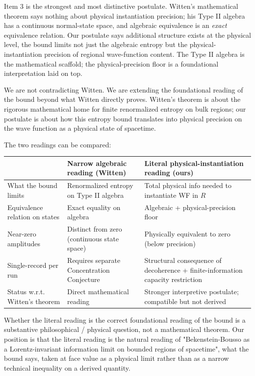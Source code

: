 \documentclass[11pt,a4paper]{article}
\begin{document}
Item 3 is the strongest and most distinctive postulate. Witten's mathematical theorem says nothing about physical instantiation precision; his Type II algebra has a continuous normal-state space, and algebraic equivalence is an \emph{exact} equivalence relation. Our postulate says additional structure exists at the physical level, the bound limits not just the algebraic entropy but the physical-instantiation precision of regional wave-function content. The Type II algebra is the mathematical scaffold; the physical-precision floor is a foundational interpretation laid on top.

We are not contradicting Witten. We are extending the foundational reading of the bound beyond what Witten directly proves. Witten's theorem is about the rigorous mathematical home for finite renormalized entropy on bulk regions; our postulate is about how this entropy bound translates into physical precision on the wave function as a physical state of spacetime.

The two readings can be compared:

\begin{center}
\small
\begin{tabularx}{\linewidth}{|Y|Y|Y|}
\hline
\textbf{} & \textbf{Narrow algebraic reading (Witten)} & \textbf{Literal physical-instantiation reading (ours)} \\
\hline
What the bound limits & Renormalized entropy on Type II algebra & Total physical info needed to instantiate WF in $R$ \\
\hline
Equivalence relation on states & Exact equality on algebra & Algebraic + physical-precision floor \\
\hline
Near-zero amplitudes & Distinct from zero (continuous state space) & Physically equivalent to zero (below precision) \\
\hline
Single-record per run & Requires separate Concentration Conjecture & Structural consequence of decoherence + finite-information capacity restriction \\
\hline
Status w.r.t. Witten's theorem & Direct mathematical reading & Stronger interpretive postulate; compatible but not derived \\
\hline
\end{tabularx}
\end{center}

Whether the literal reading is the correct foundational reading of the bound is a substantive philosophical / physical question, not a mathematical theorem. Our position is that the literal reading is the natural reading of "Bekenstein-Bousso as a Lorentz-invariant information limit on bounded regions of spacetime", what the bound says, taken at face value as a physical limit rather than as a narrow technical inequality on a derived quantity.
\end{document}
